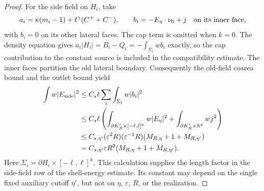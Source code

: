 \begin{proof}
For the side field on $H_i$, take
\[
 a_i=\kappa(m_i-1)+\ell^\gamma(C^++C^-),\qquad
 b_i=-E_\eta\cdot\nu_0+j
       \quad\hbox{on its inner face,}
\]
with $b_i=0$ on its other lateral faces.  The cap term is omitted
when $k=0$.  The density equation gives
$a_i|H_i|=B_i-Q_i=-\int_{\Sigma_i}w b_i$ exactly, so the cap
contribution to the constant source is included in the compatibility
estimate.  The inner faces partition the old lateral boundary.
Consequently the old-field coarea bound and the outlet bound yield
\begin{align*}
 \int w|E_{\rm side}|^2
 &\le C_s\ell\sum_i\int_{\Sigma_i}w|b_i|^2\\
 &\le C_s\ell\left(
      \int_{\partial K'_R\times[-\ell,\ell]^k}w|E_\eta|^2
          +\int_{\partial K'_R\times\mathbb R^k}wj^2\right)\\
 &\le C_{s,\eta'}(\varepsilon^2R)(\varepsilon^{-1}R)
                    (M_{R,\eta}+1+M_{R,\eta'})\\
 &=C_{s,\eta'}\varepsilon R^2(M_{R,\eta}+1+M_{R,\eta'}).
\end{align*}
Here $\Sigma_i=\partial H_i\times[-\ell,\ell]^k$.
This calculation supplies the length factor in the side-field row
of the shell-energy estimate.  Its constant may depend on the single
fixed auxiliary cutoff $\eta'$, but not on $\eta$, $\varepsilon$,
$R$, or the realization.


\end{proof}
